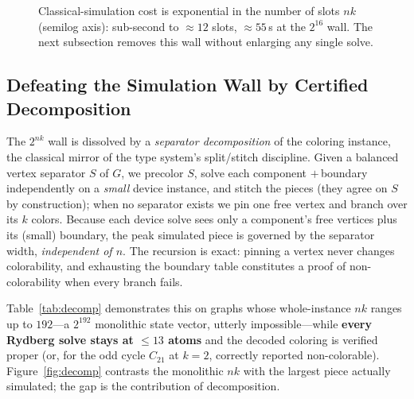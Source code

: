 \documentclass[11pt]{article}
\theoremstyle{definition}
\theoremstyle{remark}
\begin{document}
\begin{figure}[h]
\centering
{}
\caption{Classical-simulation cost is exponential in the number of slots
$nk$ (semilog axis): sub-second to $\approx 12$ slots, $\approx 55$\,s at the
$2^{16}$ wall. The next subsection removes this wall without enlarging any single
solve.}
\label{fig:wall}
\end{figure}

\subsection{Defeating the Simulation Wall by Certified Decomposition}
\label{sec:decomp}

The $2^{nk}$ wall is dissolved by a \emph{separator decomposition} of the coloring
instance, the classical mirror of the type system's split/stitch discipline. Given
a balanced vertex separator $S$ of $G$, we precolor $S$, solve each component
$+\,$boundary independently on a \emph{small} device instance, and stitch the
pieces (they agree on $S$ by construction); when no separator exists we pin one
free vertex and branch over its $k$ colors. Because each device solve sees only a
component's free vertices plus its (small) boundary, the peak simulated piece is
governed by the separator width, \emph{independent of $n$}. The recursion is exact:
pinning a vertex never changes colorability, and exhausting the boundary table
constitutes a proof of non-colorability when every branch fails.

Table~\ref{tab:decomp} demonstrates this on graphs whose whole-instance $nk$ ranges
up to $192$---a $2^{192}$ monolithic state vector, utterly impossible---while
\textbf{every Rydberg solve stays at $\le 13$ atoms} and the decoded coloring is
verified proper (or, for the odd cycle $C_{21}$ at $k=2$, correctly reported
non-colorable). Figure~\ref{fig:decomp} contrasts the monolithic $nk$ with the
largest piece actually simulated; the gap is the contribution of decomposition.
\end{document}
